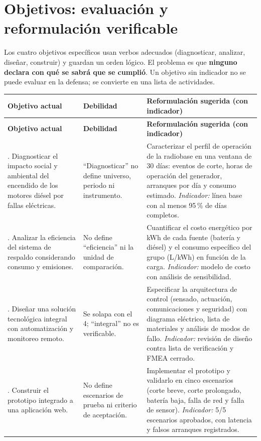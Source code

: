\documentclass[11pt,a4paper]{article}
\begin{document}
\section{Objetivos: evaluación y reformulación verificable}

Los cuatro objetivos específicos usan verbos adecuados (diagnosticar, analizar, diseñar, construir) y guardan un orden lógico. El problema es que \textbf{ninguno declara con qué se sabrá que se cumplió}. Un objetivo sin indicador no se puede evaluar en la defensa; se convierte en una lista de actividades.

\begingroup\small
\begin{longtable}{@{}>{\raggedright\arraybackslash}p{4.4cm} >{\raggedright\arraybackslash}p{5.2cm} >{\raggedright\arraybackslash}p{6.0cm}@{}}
\toprule
\textbf{Objetivo actual} & \textbf{Debilidad} & \textbf{Reformulación sugerida (con indicador)} \\
\midrule
\endfirsthead
\toprule
\textbf{Objetivo actual} & \textbf{Debilidad} & \textbf{Reformulación sugerida (con indicador)} \\
\midrule
\endhead
1. Diagnosticar el impacto social y ambiental del encendido de los motores diésel por fallas eléctricas. & ``Diagnosticar'' no define universo, periodo ni instrumento. & Caracterizar el perfil de operación de la radiobase en una ventana de 30 días: eventos de corte, horas de operación del generador, arranques por día y consumo estimado. \emph{Indicador:} línea base con al menos 95\,\% de días completos. \\
2. Analizar la eficiencia del sistema de respaldo considerando consumo y emisiones. & No define ``eficiencia'' ni la unidad de comparación. & Cuantificar el costo energético por kWh de cada fuente (batería y diésel) y el consumo específico del grupo (L/kWh) en función de la carga. \emph{Indicador:} modelo de costo con análisis de sensibilidad. \\
3. Diseñar una solución tecnológica integral con automatización y monitoreo remoto. & Se solapa con el 4; ``integral'' no es verificable. & Especificar la arquitectura de control (sensado, actuación, comunicaciones y seguridad) con diagrama eléctrico, lista de materiales y análisis de modos de fallo. \emph{Indicador:} revisión de diseño contra lista de verificación y FMEA cerrado. \\
4. Construir el prototipo integrado a una aplicación web. & No define escenarios de prueba ni criterio de aceptación. & Implementar el prototipo y validarlo en cinco escenarios (corte breve, corte prolongado, batería baja, falla de red y falla de sensor). \emph{Indicador:} 5/5 escenarios aprobados, con latencia y falsos arranques registrados. \\
\bottomrule
\end{longtable}
\endgroup
\end{document}
